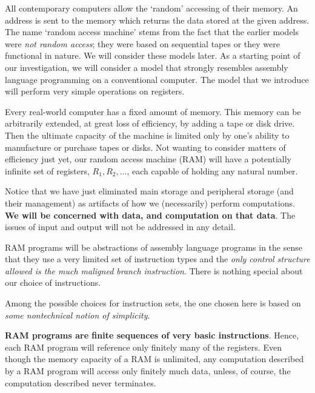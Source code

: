 \documentclass[11pt]{book}
\theoremstyle{definition}
\theoremstyle{plain}
\theoremstyle{problemstyle}
\theoremstyle{remark}
\theoremstyle{definition}
\begin{document}
\begin{mybox}[RAM]
    \label{box:ram}
    All contemporary computers allow the `random' accessing of their memory. An address is sent to the memory which returns the data stored at the given address. The name `random access machine' stems from the fact that the earlier models were \emph{not random access}; they were based on sequential tapes or they were functional in nature. We will consider these models later. As a starting point of our investigation, we will consider a model that strongly resembles assembly language programming on a conventional computer. The model that we introduce will perform very simple operations on registers. 

    Every real-world computer has a fixed amount of memory. This memory can be arbitrarily extended, at great loss of efficiency, by adding a tape or disk drive. Then the ultimate capacity of the machine is limited only by one's ability to manufacture or purchase tapes or disks. Not wanting to consider matters of efficiency just yet, our random access machine (RAM) will have a potentially infinite set of registers, $R_1,R_2,\dots$, each capable of holding any natural number. 

    Notice that we have just eliminated main storage and peripheral storage (and their management) as artifacts of how we (necessarily) perform computations. \textbf{We will be concerned with data, and computation on that data}. The issues of input and output will not be addressed in any detail.

    RAM programs will be abstractions of assembly language programs in the sense that they use a very limited set of instruction types and the \emph{only control structure allowed is the much maligned branch instruction}. There is nothing special about our choice of instructions.

    Among the possible choices for instruction sets, the one chosen here is based on \emph{some nontechnical notion of simplicity}. 

    \textbf{RAM programs are finite sequences of very basic instructions}. Hence, each RAM program will reference only finitely many of the registers. Even though the memory capacity of a RAM is unlimited, any computation described by a RAM program will access only finitely much data, unless, of course, the computation described never terminates.


\end{mybox}
\end{document}
